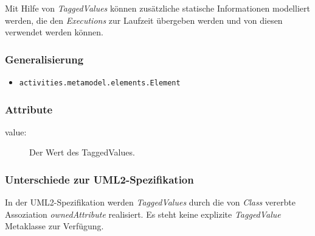 Mit Hilfe von \emph{TaggedValues} können zusätzliche statische Informationen modelliert werden, die den \emph{Executions} zur Laufzeit übergeben werden und von diesen verwendet werden können.

\subsubsection{Generalisierung}
\begin{itemize}
\item \texttt{activities.metamodel.elements.Element}
\end{itemize}

\subsubsection{Attribute}
\begin{description}
\item[value:] Der Wert des TaggedValues.
\end{description}


\subsubsection{Unterschiede zur UML2-Spezifikation}
In der UML2-Spezifikation werden \emph{TaggedValues} durch die von \emph{Class} vererbte Assoziation \emph{ownedAttribute} realisiert. Es steht keine explizite \emph{TaggedValue} Metaklasse zur Verfügung.



